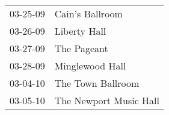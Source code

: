 \begin{supertabular}{p{0.07\textwidth}p{0.23\textwidth}}
 03-25-09 &         Cain's Ballroom \\
 03-26-09 &            Liberty Hall \\
 03-27-09 &             The Pageant \\
 03-28-09 &         Minglewood Hall \\
 03-04-10 &       The Town Ballroom \\
 03-05-10 &  The Newport Music Hall \\
\end{supertabular}
